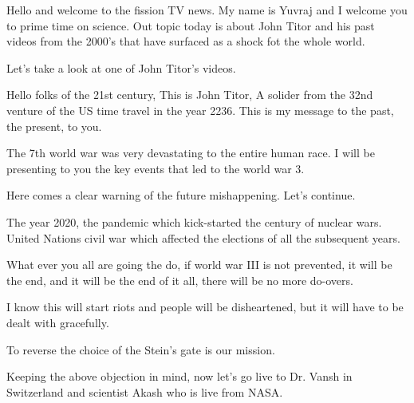 
\DramPer



\begin{drama}

    \repspeaks Hello and welcome to the fission TV news. My name is Yuvraj and I welcome you to prime time on science.
    Out topic today is about John Titor and his past videos from the 2000's that have surfaced as a shock fot the whole world.

    Let's take a look at one of John Titor's videos.

    \johnspeaks Hello folks of the 21st century,
    This is John Titor,
    A solider from the 32nd venture of the US time travel in the year 2236.
    This is my message to the past, the present, to you.

    The 7th world war was very devastating to the entire human race. I will be presenting to you the key events that led to the world war 3.

    \repspeaks {} Here comes a clear warning of the future mishappening. Let's continue.

    \johnspeaks The year 2020, the pandemic which kick-started the century of nuclear wars.
    United Nations civil war which affected the elections of all the subsequent years.

    What ever you all are going the do, if world war III is not prevented, it will be the end, and it will be the end of it all, there will be no more do-overs.


    I know this will start riots and people will be disheartened, but it will have to be dealt with gracefully.


    To reverse the choice of the Stein's gate is our mission.

    \repspeaks Keeping the above objection in mind, now let's go live to Dr. Vansh in Switzerland and scientist Akash who is live from NASA.


\end{drama}
